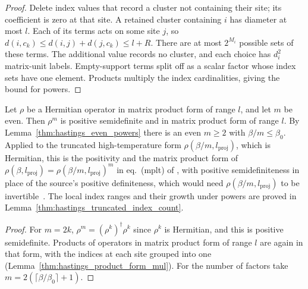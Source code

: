 \begin{proof}\leanok
    Delete index values that record a cluster not containing their site;
    its coefficient is zero at that site. A retained cluster containing $i$
    has diameter at most $l$. Each of its terms acts on some site $j$, so
    $d(i,c_k)\le d(i,j)+d(j,c_k)\le l+R$. There are at most $2^{M_i}$
    possible sets of these terms. The additional value records no cluster,
    and each choice has $d_i^2$ matrix-unit labels. Empty-support terms split
    off as a scalar factor whose index sets have one element.
    Products multiply the index cardinalities, giving the bound for powers.
\end{proof}

\begin{theorem}
    \label{thm:hastings_thermal_all_temperatures}
    \leanok
    Let $\rho$ be a Hermitian operator in matrix product form of range $l$, and
    let $m$ be even. Then $\rho^m$ is positive semidefinite and in matrix product
    form of range $l$. By Lemma~\ref{thm:hastings_even_powers} there is an even
    $m\ge2$ with $\beta/m\le\beta_0$. Applied to the truncated high-temperature
    form $\rho(\beta/m,l_{\mathrm{proj}})$, which is Hermitian, this is the
    positivity and the matrix product form of
    $\rho(\beta,l_{\mathrm{proj}})=\rho(\beta/m,l_{\mathrm{proj}})^m$ in
    eq.~(mplt) of \cite[lines 1303--1317]{Hastings2006Solving}, with positive
    semidefiniteness in place of the source's positive definiteness, which
    would need $\rho(\beta/m,l_{\mathrm{proj}})$ to be
    invertible~\cite{gap:hastings05_mplt_positivity}. The local index ranges
    and their growth under powers are proved in
    Lemma~\ref{thm:hastings_truncated_index_count}.
\end{theorem}
\begin{proof}\leanok
    For $m=2k$, $\rho^m=(\rho^k)^\dagger\rho^k$ since $\rho^k$ is Hermitian, and
    this is positive semidefinite. Products of operators in matrix product form
    of range $l$ are again in that form, with the indices at each site grouped
    into one (Lemma~\ref{thm:hastings_product_form_mul}). For the number of
    factors take $m=2(\lceil\beta/\beta_0\rceil+1)$.
\end{proof}


